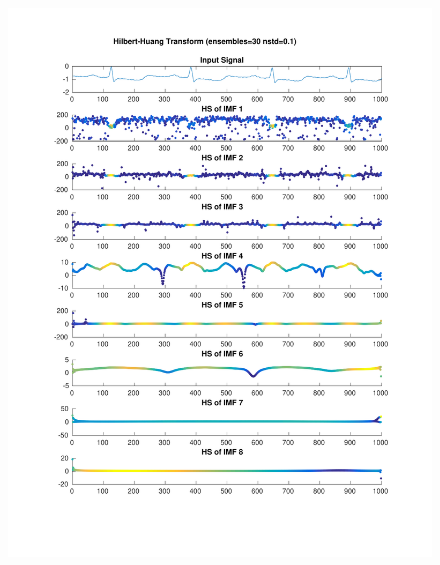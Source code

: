 \documentclass{beamer}
\begin{document}
\begin{frame}
\begin{columns}
\begin{figure}
\includegraphics[width=\textwidth]{fig/112l1_hht_ensemble.pdf}
\end{figure}
\end{columns}
\end{frame}


\end{document}
